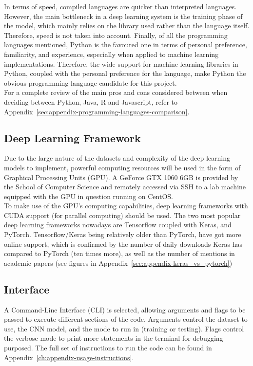 In terms of speed, compiled languages are quicker than interpreted languages. However, the main bottleneck in a deep learning system is the training phase of the model, which mainly relies on the library used rather than the language itself. Therefore, speed is not taken into account. Finally, of all the programming languages mentioned, Python is the favoured one in terms of personal preference, familiarity, and experience, especially when applied to machine learning implementations. Therefore, the wide support for machine learning libraries in Python, coupled with the personal preference for the language, make Python the obvious programming language candidate for this project.\\

For a complete review of the main pros and cons considered between when deciding between Python, Java, R and Javascript, refer to Appendix~\ref{sec:appendix-programming-languages-comparison}.

\subsection{Deep Learning Framework}

Due to the large nature of the datasets and complexity of the deep learning models to implement, powerful computing resources will be used in the form of Graphical Processing Units (GPU). A GeForce GTX 1060 6GB is provided by the School of Computer Science and remotely accessed via SSH to a lab machine equipped with the GPU in question running on CentOS.\\

To make use of the GPU's computing capabilities, deep learning frameworks with CUDA support (for parallel computing) should be used. The two most popular deep learning frameworks nowadays are Tensorflow coupled with Keras, and PyTorch. Tensorflow/Keras being relatively older than PyTorch, have got more online support, which is confirmed by the number of daily downloads Keras has compared to PyTorch (ten times more), as well as the number of mentions in academic papers (see figures  in Appendix~\ref{sec:appendix-keras_vs_pytorch})

\subsection{Interface}

A Command-Line Interface (CLI) is selected, allowing arguments and flags to be passed to execute different sections of the code. Arguments control the dataset to use, the CNN model, and the mode to run in (training or testing). Flags control the verbose mode to print more statements in the terminal for debugging purposed. The full set of instructions to run the code can be found in Appendix~\ref{ch:appendix-usage-instructions}.

